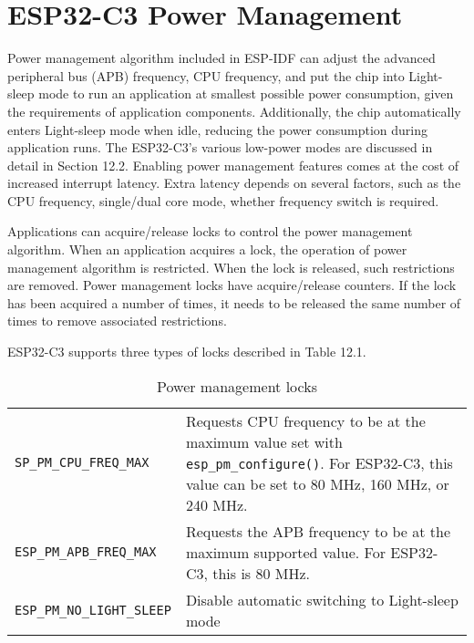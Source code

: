 \documentclass[a4paper,12pt]{book}
\begin{document}
\section{ESP32-C3 Power Management}
Power management algorithm included in ESP-IDF can adjust the advanced peripheral bus (APB) frequency, CPU frequency, and put the chip into Light-sleep mode to run an application at smallest possible power consumption, given the requirements of application components. Additionally, the chip automatically enters Light-sleep mode when idle, reducing the power consumption during application runs. The ESP32-C3's various low-power modes are discussed in detail in Section 12.2. Enabling power management features comes at the cost of increased interrupt latency. Extra latency depends on several factors, such as the CPU frequency, single/dual core mode, whether frequency switch is required.

Applications can acquire/release locks to control the power management algorithm. When an application acquires a lock, the operation of power management algorithm is restricted. When the lock is released, such restrictions are removed. Power management locks have acquire/release counters. If the lock has been acquired a number of times, it needs to be released the same number of times to remove associated restrictions.

ESP32-C3 supports three types of locks described in Table 12.1.

\begin{table}[h!]
    \renewcommand{\arraystretch}{1.2}
    \caption{Power management locks}
    \begin{tabular}{|>{\footnotesize}m{}|>{\footnotesize}m{}|}
        \hline
        \rowcolor{LightBlue}\multicolumn{1}{|c|}{\textbf{Power management lock}}&\multicolumn{1}{c|}{\textbf{Description}}\\
        \hline
        \verb|SP_PM_CPU_FREQ_MAX|&Requests CPU frequency to be at the maximum value set with \verb|esp_pm_configure()|. For ESP32-C3, this value can be set to 80 MHz, 160 MHz, or 240 MHz.\\
        \hline
        \verb|ESP_PM_APB_FREQ_MAX|&Requests the APB frequency to be at the maximum supported value. For ESP32-C3, this is 80 MHz.\\
        \hline
        \verb|ESP_PM_NO_LIGHT_SLEEP|&Disable automatic switching to Light-sleep mode\\
        \hline
    \end{tabular}
\end{table}
\end{document}
